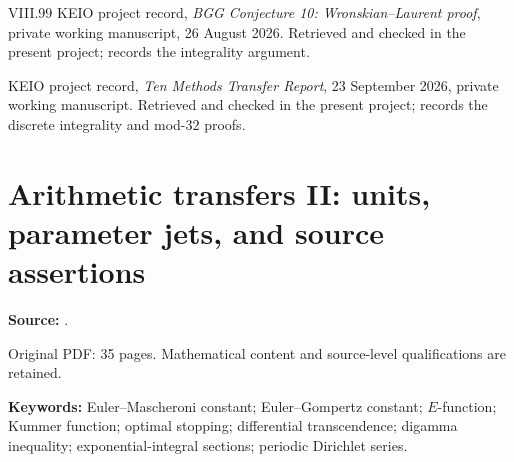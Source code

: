 \documentclass[11pt,a4paper]{article}
\theoremstyle{definition}
\theoremstyle{remark}
\DeclareMathOperator{\Ein}{Ein}
\numberwithin{equation}{section}
\renewcommand{\thesection}{\Roman{part}.\arabic{section}}
\renewcommand{\theHsection}{\arabic{part}.main.\arabic{section}}
\begin{document}
\begin{thebibliography}{VIII.99}
KEIO project record,
\emph{BGG Conjecture 10: Wronskian--Laurent proof},
private working manuscript, 26 August 2026. Retrieved and checked
in the present project; records the integrality argument.

KEIO project record,
\emph{Ten Methods Transfer Report}, 23 September 2026,
private working manuscript. Retrieved and checked in the present project;
records the discrete integrality and mod-$32$ proofs.
\end{thebibliography}
\label{part1:end}
\clearpage
\setcounter{section}{0}\setcounter{subsection}{0}
\renewcommand{\thesection}{\Roman{part}.\arabic{section}}
\renewcommand{\theHsection}{\arabic{part}.main.\arabic{section}}
\renewcommand{\refname}{References for Part II}
\part{Arithmetic transfers II: units, parameter jets, and source assertions}
\label{part2:start}
\noindent\textbf{Source:} {\small{}}.

Original PDF: 35 pages. Mathematical content and source-level qualifications are retained.


\begin{abstract}
We classify which positive rational-parameter Kummer values at positive
algebraic arguments are units in the ring of $E$-values, using the recent
phase morphism of Fischler--Rivoal. At argument one the only cases are
the exponential-polynomial family and $M(2,3,1)=2$. The same morphism
gives a denominator obstruction for
$\Ein(1)=\gamma+\delta/e$. Independent transfers give algebraically
independent dimension derivatives of a Bessel stopping boundary and
differential transcendence over $\mathbb C(d)$.
We also supply proofs or counterexamples for ten distinct assertions
left unproved in precisely identified source versions: a Whittaker
real-zero branch conjecture, Vargas's exterior-zero conjecture,
G\"orgens' local-minimum conjecture and two stated endpoint expectations,
a sharp digamma exponent question, two Gurland-ratio questions,
Bolbachan's digamma-limit conjecture, and an odd-totient sign question.
The last limit conjecture fails exponentially, with growth rate
$1/\log2$. Further results sharpen periodic-Dirichlet descent bounds.
The source count includes minor questions and preprints; it is not a
claim of ten major or historically first breakthroughs. Current priority
is not certified, especially where a revised journal version could not
be inspected. Neither irrationality nor transcendence of $\gamma$ is
proved.
\end{abstract}
\noindent\textbf{Keywords:} Euler--Mascheroni constant; Euler--Gompertz constant;
$E$-function; Kummer function; optimal stopping; differential transcendence;
digamma inequality; exponential-integral sections; periodic Dirichlet series.
\end{document}
